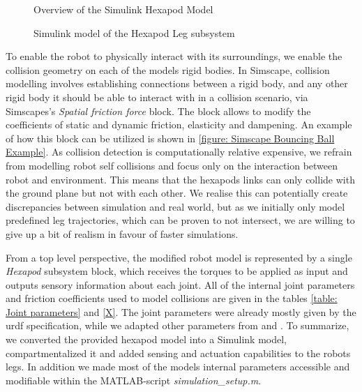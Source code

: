 \begin{figure}[h]
	\centerline{}
	\caption{Overview of the Simulink Hexapod Model}
	\label{figure: Hexapod Model Overview}
\end{figure}

\begin{figure}
	\centerline{}
	\caption{Simulink model of the Hexapod Leg subsystem}
	\label{figure: Hexapod Leg}
\end{figure}

To enable the robot to physically interact with its surroundings, we enable the collision geometry on each of the models rigid bodies.
In Simscape, collision modelling involves establishing connections between a rigid body, and any other rigid body it should be able to interact with in a collision scenario, via Simscapes's \textit{Spatial friction force} block.
The block allows to modify the coefficients of static and dynamic friction, elasticity and dampening.
An example of how this block can be utilized is shown in \ref{figure: Simscape Bouncing Ball Example}.
As collision detection is computationally relative expensive, we refrain from modelling robot self collisions and focus only on the interaction between robot and environment.
This means that the hexapods links can only collide with the ground plane but not with each other.
We realise this can potentially create discrepancies between simulation and real world, but as we initially only model predefined leg trajectories, which can be proven to not intersect, we are willing to give up a bit of realism in favour of faster simulations.

From a top level perspective, the modified robot model is represented by a single \textit{Hexapod} subsystem block, which receives the torques to be applied as input and outputs sensory information about each joint.
All of the internal joint parameters and friction coefficients used to model collisions are given in the tables \ref{table: Joint parameters} and \ref{X}.
The joint parameters were already mostly given by the urdf specification, while we adapted other parameters from \parencite{trotta2022walking} and \parencite{AUTHOR2}.
To summarize, we converted the provided hexapod model into a Simulink model, compartmentalized it and added sensing and actuation capabilities to the robots legs.
In addition we made most of the models internal parameters accessible and modifiable within the MATLAB-script \textit{simulation\_setup.m}.



